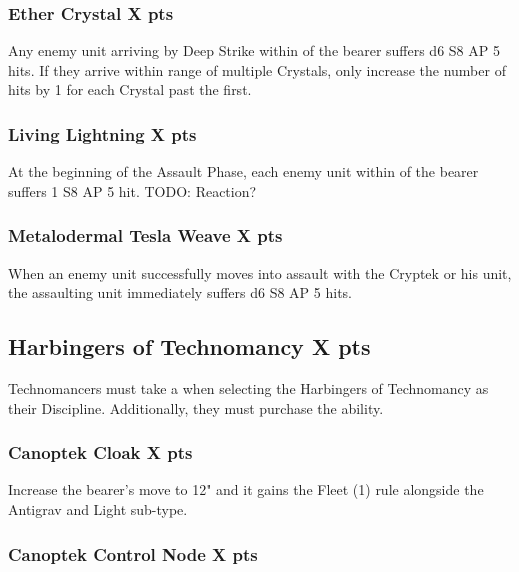\subsubsection[Ether Crystal ]{Ether Crystal  \hrulefill X pts}

Any enemy unit arriving by Deep Strike within  of the bearer suffers d6 S8 AP 5 hits. If they arrive within range of multiple Crystals, only increase the number of hits by 1 for each Crystal past the first.

\subsubsection[Living Lightning ]{Living Lightning  \hrulefill X pts}

At the beginning of the Assault Phase, each enemy unit within  of the bearer suffers 1 S8 AP 5 hit. TODO: Reaction?

\subsubsection[Metalodermal Tesla Weave ]{Metalodermal Tesla Weave  \hrulefill X pts}

When an enemy unit successfully moves into assault with the Cryptek or his unit, the assaulting unit immediately suffers d6 S8 AP 5 hits.




\subsection[Harbingers of Technomancy ]{Harbingers of Technomancy  \hrulefill X pts}

Technomancers must take a  when selecting the Harbingers of Technomancy as their Discipline. Additionally, they must purchase the  ability.

\subsubsection[Canoptek Cloak ]{Canoptek Cloak  \hrulefill X pts}

Increase the bearer's move to 12" and it gains the Fleet (1) rule alongside the Antigrav and Light sub-type.

\subsubsection[Canoptek Control Node ]{Canoptek Control Node  \hrulefill X pts}

